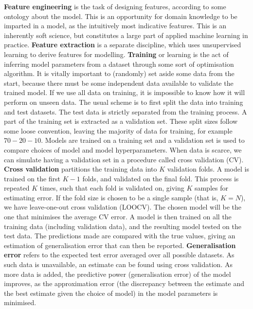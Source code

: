 \documentclass[11pt]{amsart}
\begin{document}
\textbf{Feature engineering} is the task of designing features, according to some ontology about the model. This is an opportunity for domain knowledge to be imparted in a model, as the intuitively most indicative features. This is an inherently soft science, but constitutes a large part of applied machine learning in practice. \textbf{Feature extraction} is a separate discipline, which uses unsupervised learning to derive features for modelling. \textbf{Training} or learning is the act of inferring model parameters from a dataset through some sort of optimisation algorithm. It is vitally important to (randomly) set aside some data from the start, because there must be some independent data available to validate the trained model. If we use all data on training, it is impossible to know how it will perform on unseen data. The usual scheme is to first split the data into training and test datasets. The test data is strictly separated from the training process. A part of the training set is extracted as a validation set. These split sizes follow some loose convention, leaving the majority of data for training, for example $70-20-10$. Models are trained on a training set and a validation set is used to compare choices of model and model hyperparameters. When data is scarce, we can simulate having a validation set in a procedure called cross validation (CV). \textbf{Cross validation} partitions the training data into $K$ validation folds. A model is trained on the first $K - 1$ folds, and validated on the final fold. This process is repeated $K$ times, such that each fold is validated on, giving $K$ samples for estimating error. If the fold size is chosen to be a single sample (that is, $K = N$), we have leave-one-out cross validation (LOOCV). The chosen model will be the one that minimises the average CV error. A model is then trained on all the training data (including validation data), and the resulting model tested on the test data. The predictions made are compared with the true values, giving an estimation of generalisation error that can then be reported. \textbf{Generalisation error} refers to the expected test error averaged over all possible datasets. As such data is unavailable, an estimate can be found using cross validation. As more data is added, the predictive power (generalisation error) of the model improves, as the approximation error (the discrepancy between the estimate and the best estimate given the choice of model) in the model parameters is minimised.
\end{document}
